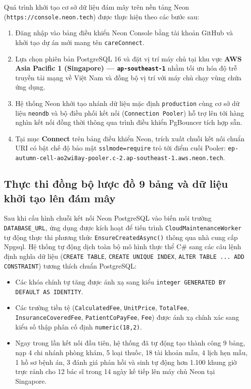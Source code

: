 Quá trình khởi tạo cơ sở dữ liệu đám mây trên nền tảng Neon (\texttt{https://console.neon.tech}) được thực hiện theo các bước sau:
\begin{enumerate}
    \item Đăng nhập vào bảng điều khiển Neon Console bằng tài khoản GitHub và khởi tạo dự án mới mang tên \texttt{careConnect}.
    \item Lựa chọn phiên bản PostgreSQL 16 và đặt vị trí máy chủ tại khu vực \textbf{AWS Asia Pacific 1 (Singapore) --- \texttt{ap-southeast-1}} nhằm tối ưu hóa độ trễ truyền tải mạng về Việt Nam và đồng bộ vị trí với máy chủ chạy vùng chứa ứng dụng.
    \item Hệ thống Neon khởi tạo nhánh dữ liệu mặc định \texttt{production} cùng cơ sở dữ liệu \texttt{neondb} và bộ điều phối kết nối (\texttt{Connection Pooler}) hỗ trợ lên tới hàng nghìn kết nối đồng thời thông qua trình điều khiển PgBouncer tích hợp sẵn.
    \item Tại mục \textbf{Connect} trên bảng điều khiển Neon, trích xuất chuỗi kết nối chuẩn URI có bật chế độ bảo mật \texttt{sslmode=require} trỏ tới điểm cuối Pooler: \texttt{ep-autumn-cell-ao2wi8ay-pooler.c-2.ap-southeast-1.aws.neon.tech}.
\end{enumerate}

\subsection{Thực thi đồng bộ lược đồ 9 bảng và dữ liệu khởi tạo lên đám mây}

Sau khi cấu hình chuỗi kết nối Neon PostgreSQL vào biến môi trường \texttt{DATABASE\_URL}, ứng dụng được kích hoạt để tiến trình \texttt{CloudMaintenanceWorker} tự động thực thi phương thức \texttt{EnsureCreatedAsync()} thông qua nhà cung cấp Npgsql. Hệ thống tự động dịch toàn bộ mô hình thực thể C\# sang các câu lệnh định nghĩa dữ liệu (\texttt{CREATE TABLE}, \texttt{CREATE UNIQUE INDEX}, \texttt{ALTER TABLE ... ADD CONSTRAINT}) tương thích chuẩn PostgreSQL:
\begin{itemize}
    \item Các khóa chính tự tăng được ánh xạ sang kiểu \texttt{integer GENERATED BY DEFAULT AS IDENTITY}.
    \item Các trường tiền tệ (\texttt{CalculatedFee}, \texttt{UnitPrice}, \texttt{TotalFee}, \texttt{InsuranceCoveredFee}, \texttt{PatientCoPayFee}, \texttt{Fee}) được ánh xạ chính xác sang kiểu số thập phân cố định \texttt{numeric(18,2)}.
    \item Ngay trong lần kết nối đầu tiên, hệ thống đã tự động tạo thành công 9 bảng, nạp 4 chi nhánh phòng khám, 5 loại thuốc, 18 tài khoản mẫu, 4 lịch hẹn mẫu, 1 hồ sơ bệnh án, 3 đánh giá phản hồi và sinh tự động hơn 1.100 khung giờ trực rảnh cho 12 bác sĩ trong 14 ngày kế tiếp lên máy chủ Neon tại Singapore.
\end{itemize}

